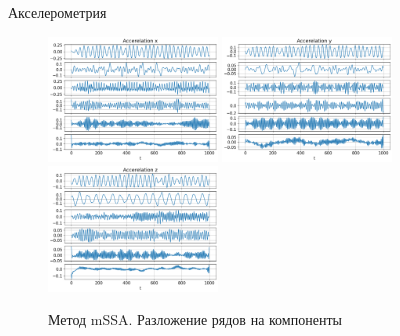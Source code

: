 \begin{frame}{Акселерометрия}
{			\begin{figure}
				\includegraphics[width=0.4\textwidth, keepaspectratio]{img/mssa_acceler_comp1.png}
				\includegraphics[width=0.4\textwidth, keepaspectratio]{img/mssa_acceler_comp2.png}
				\includegraphics[width=0.4\textwidth, keepaspectratio]{img/mssa_acceler_comp3.png}
				\caption{Метод mSSA. Разложение рядов на компоненты}
			\end{figure}
			
		}
		
\end{frame}

